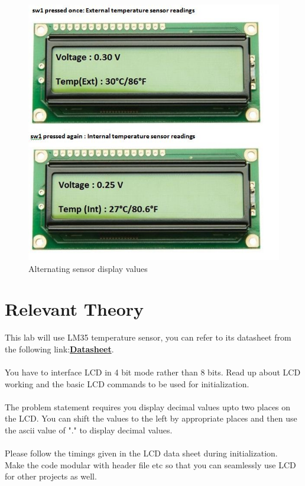 \documentclass{article} %
\newcounter{other}
\begin{document}
\begin{figure}
\centering
\includegraphics[scale=0.5]{flow.JPG}
\caption{Alternating sensor display values}
\end{figure}




\newpage
\section {Relevant Theory}

This lab will use LM35 temperature sensor, you can refer to its datasheet from the following link:\href{http://www.ti.com/product/LM35/datasheet}{\textbf{Datasheet}}.
\\
\\
You have to interface LCD in 4 bit mode rather than 8 bits. Read up about LCD working and the basic LCD commands to be used for initialization.
\newline
\\
\\
The problem statement requires you display decimal values upto two places on the LCD. You can shift the values to the left by appropriate places and then use the ascii value of "." to display decimal values.  
\\
\\
Please follow the timings given in the LCD data sheet during initialization. 
\\
Make the code modular with header file etc so that you can seamlessly use LCD for other projects as well.
\end{document}
